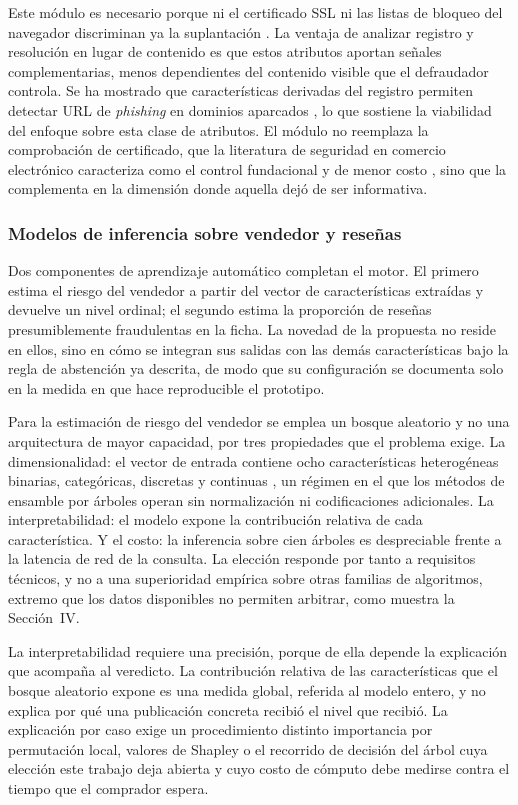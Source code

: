 Este módulo es necesario porque ni el certificado SSL ni las listas de bloqueo del navegador
discriminan ya la suplantación \cite{ref25}. La ventaja de analizar registro y resolución en
lugar de contenido es que estos atributos aportan señales complementarias, menos dependientes
del contenido visible que el defraudador controla. Se ha mostrado que
características derivadas del registro permiten detectar URL de \textit{phishing} en dominios
aparcados \cite{ref7}, lo que sostiene la viabilidad del enfoque sobre esta clase de
atributos. El módulo no reemplaza la comprobación de
certificado, que la literatura de seguridad en comercio electrónico caracteriza como el
control fundacional y de menor costo \cite{ref30}, sino que la complementa en la dimensión
donde aquella dejó de ser informativa.

\subsubsection{Modelos de inferencia sobre vendedor y reseñas}

Dos componentes de aprendizaje automático completan el motor. El primero estima el riesgo del
vendedor a partir del vector de características extraídas y devuelve un nivel ordinal; el
segundo estima la proporción de reseñas presumiblemente fraudulentas en la ficha. La novedad
de la propuesta no reside en ellos, sino en cómo se integran sus salidas con las demás
características bajo la regla de abstención ya descrita, de modo que su configuración se documenta
solo en la medida en que hace reproducible el prototipo.

Para la estimación de riesgo del vendedor se emplea un bosque aleatorio y no una arquitectura
de mayor capacidad, por tres propiedades que el problema exige. La dimensionalidad: el vector
de entrada contiene ocho características heterogéneas   binarias, categóricas, discretas y
continuas   , un régimen en el que los métodos de ensamble por árboles operan sin normalización
ni codificaciones adicionales. La interpretabilidad: el modelo expone la contribución relativa
de cada característica. Y el costo: la inferencia sobre cien árboles es despreciable frente a
la latencia de red de la consulta. La elección responde por tanto a requisitos técnicos, y no
a una superioridad empírica sobre otras familias de algoritmos, extremo que los datos
disponibles no permiten arbitrar, como muestra la Sección~IV.

La interpretabilidad requiere una precisión, porque de ella depende la explicación que
acompaña al veredicto. La contribución relativa de las características que el bosque aleatorio
expone es una medida global, referida al modelo entero, y no explica por qué una publicación
concreta recibió el nivel que recibió. La explicación por caso exige un procedimiento distinto
importancia por permutación local, valores de Shapley o el recorrido de decisión del árbol
cuya elección este trabajo deja abierta y cuyo costo de cómputo debe medirse contra el tiempo
que el comprador espera.

